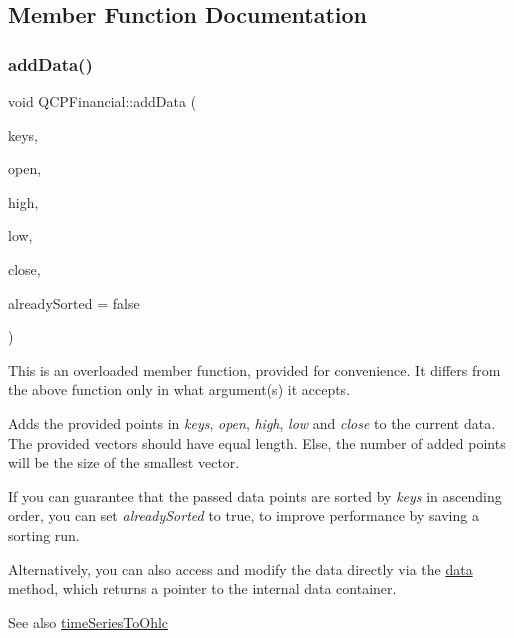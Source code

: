 \subsection{Member Function Documentation}
\mbox{\label{class_q_c_p_financial_a372ac031e44a7a6c912d203556af96f7}} 
\subsubsection{\texorpdfstring{add\+Data()}{addData()}\hspace{0.1cm}{\footnotesize\ttfamily [1/2]}}
{\footnotesize\ttfamily void Q\+C\+P\+Financial\+::add\+Data (\begin{DoxyParamCaption}\item[{const Q\+Vector$<$ double $>$ \&}]{keys,  }\item[{const Q\+Vector$<$ double $>$ \&}]{open,  }\item[{const Q\+Vector$<$ double $>$ \&}]{high,  }\item[{const Q\+Vector$<$ double $>$ \&}]{low,  }\item[{const Q\+Vector$<$ double $>$ \&}]{close,  }\item[{bool}]{already\+Sorted = {\ttfamily false} }\end{DoxyParamCaption})}

This is an overloaded member function, provided for convenience. It differs from the above function only in what argument(s) it accepts.

Adds the provided points in {\itshape keys}, {\itshape open}, {\itshape high}, {\itshape low} and {\itshape close} to the current data. The provided vectors should have equal length. Else, the number of added points will be the size of the smallest vector.

If you can guarantee that the passed data points are sorted by {\itshape keys} in ascending order, you can set {\itshape already\+Sorted} to true, to improve performance by saving a sorting run.

Alternatively, you can also access and modify the data directly via the \hyperlink{class_q_c_p_financial_aec3f666271cf48bd7b87d84fe3f8c074}{data} method, which returns a pointer to the internal data container.

\begin{DoxySeeAlso}{See also}
\hyperlink{class_q_c_p_financial_a9a058c035040d3939b8884f4aaccb1a7}{time\+Series\+To\+Ohlc} 
\end{DoxySeeAlso}
\mbox{\label{class_q_c_p_financial_a688bbd052e00a02954ddb0068b378170}} 
